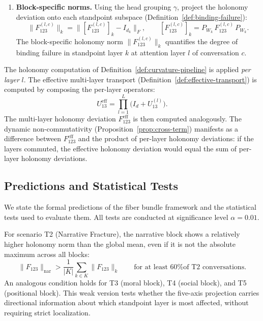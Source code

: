 \begin{definition}
\begin{enumerate}
    \item \textbf{Block-specific norms.} Using the head grouping $\gamma$, project the
    holonomy deviation onto each standpoint subspace (Definition~\ref{def:binding-failure}):
    \[
        \big\|F_{123}^{(l,c)}\big\|_k = \big\|[F_{123}^{(l,c)}]_k - I_{d_k}\big\|_F,
        \qquad [F_{123}^{(l,c)}]_k = P_{W_k}\, F_{123}^{(l,c)}\, P_{W_k}.
    \]
    The block-specific holonomy norm $\|F_{123}^{(l,c)}\|_k$ quantifies the degree of
    binding failure in standpoint layer $k$ at attention layer $l$ of conversation $c$.
\end{enumerate}
\end{definition}

\begin{remark}
\label{rem:multi-layer-curvature}
The holonomy computation of Definition~\ref{def:curvature-pipeline} is applied
\emph{per layer} $l$. The effective multi-layer transport
(Definition~\ref{def:effective-transport}) is computed by composing the per-layer operators:
\[
    U_{13}^{\mathrm{eff}} = \prod_{l=1}^{L} \big(I_d + U_{13}^{(l)}\big).
\]
The multi-layer holonomy deviation $F_{123}^{\mathrm{eff}}$ is then computed analogously. The
dynamic non-commutativity (Proposition~\ref{prop:cross-term}) manifests as a difference between
$F_{123}^{\mathrm{eff}}$ and the product of per-layer holonomy deviations: if the layers commuted,
the effective holonomy deviation would equal the sum of per-layer holonomy deviations.
\end{remark}

\subsection{Predictions and Statistical Tests}
\label{sec:exp-predictions}

We state the formal predictions of the fiber bundle framework and the statistical tests
used to evaluate them. All tests are conducted at significance level $\alpha = 0.01$.

\begin{hypothesis}
\label{hyp:block-sensitivity}
For scenario T2 (Narrative Fracture), the narrative block shows a relatively higher
holonomy norm than the global mean, even if it is not the absolute maximum across all
blocks:
\[
    \|F_{123}\|_{\mathrm{nar}} > \frac{1}{|K|}\sum_{k \in K} \|F_{123}\|_k
    \qquad \text{for at least 60\% of T2 conversations.}
\]
An analogous condition holds for T3 (moral block), T4 (social block), and T5 (positional
block). This weak version tests whether the five-axis projection carries directional
information about which standpoint layer is most affected, without requiring strict
localization.
\end{hypothesis}

